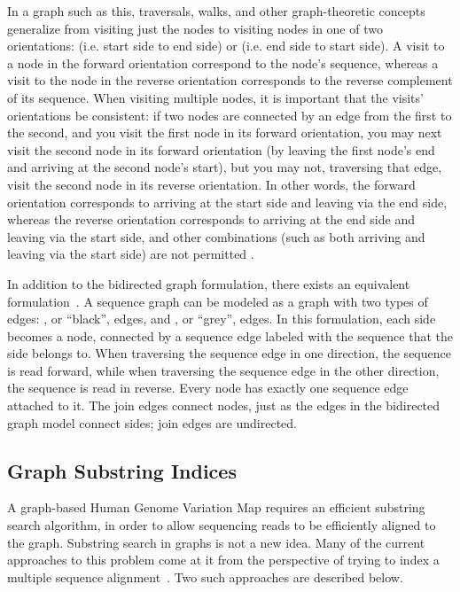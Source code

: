 In a graph such as this, traversals, walks, and other graph-theoretic concepts generalize from visiting just the nodes to visiting nodes in one of two orientations:  (i.e. start side to end side) or  (i.e. end side to start side). A visit to a node in the forward orientation correspond to the node's sequence, whereas a visit to the node in the reverse orientation corresponds to the reverse complement of its sequence. When visiting multiple nodes, it is important that the visits' orientations be consistent: if two nodes are connected by an edge from the first to the second, and you visit the first node in its forward orientation, you may next visit the second node in its forward orientation (by leaving the first node's end and arriving at the second node's start), but you may not, traversing that edge, visit the second node in its reverse orientation. In other words, the forward orientation corresponds to arriving at the start side and leaving via the end side, whereas the reverse orientation corresponds to arriving at the end side and leaving via the start side, and other combinations (such as both arriving and leaving via the start side) are not permitted \cite{bodily2016scaffoldscaffolder}.

In addition to the bidirected graph formulation, there exists an equivalent  formulation~\cite{paten2017superbubbles}. A sequence graph can be modeled as a graph with two types of edges: , or ``black'', edges, and , or ``grey'', edges. In this formulation, each side becomes a node, connected by a sequence edge labeled with the sequence that the side belongs to. When traversing the sequence edge in one direction, the sequence is read forward, while when traversing the sequence edge in the other direction, the sequence is read in reverse. Every node has exactly one sequence edge attached to it. The join edges connect nodes, just as the edges in the bidirected graph model connect sides; join edges are undirected.


\subsection{Graph Substring Indices}

A graph-based Human Genome Variation Map requires an efficient substring search algorithm, in order to allow sequencing reads to be efficiently aligned to the graph. Substring search in graphs is not a new idea. Many of the current approaches to this problem come at it from the perspective of trying to index a multiple sequence alignment~\cite{siren2014indexing}. Two such approaches are described below.

